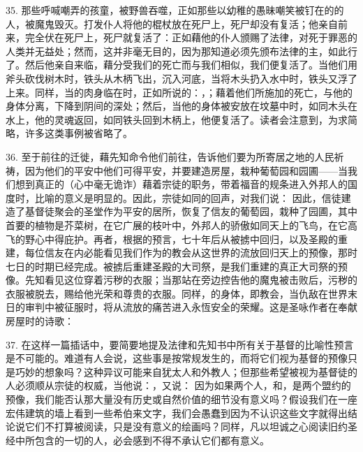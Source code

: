 35. 那些呼喊嘲弄的孩童，被野兽吞噬，正如那些以幼稚的愚昧嘲笑被钉在的的人，被魔鬼毁灭。打发仆人将他的棍杖放在死尸上，死尸却没有复活；他亲自前来，完全伏在死尸上，死尸就复活了：正如藉他的仆人颁赐了法律，对死于罪恶的人类并无益处；然而，这并非毫无目的，因为那知道必须先颁布法律的主，如此行了。然后他亲自来临，藉分受我们的死亡而与我们相似，我们便复活了。当他们用斧头砍伐树木时，铁头从木柄飞出，沉入河底，当将木头扔入水中时，铁头又浮了上来。同样，当的肉身临在时，正如所说的：，；藉着他们所施加的死亡，与他的身体分离，下降到阴间的深处；然后，当他的身体被安放在坟墓中时，如同木头在水上，他的灵魂返回，如同铁头回到木柄上，他便复活了。读者会注意到，为求简略，许多这类事例被省略了。\par

36. 至于前往的迁徙，藉先知命令他们前往，告诉他们要为所寄居之地的人民祈祷，因为他们的平安中他们可得平安，并要建造房屋，栽种葡萄园和园圃——当我们想到真正的（心中毫无诡诈）藉着宗徒的职务，带着福音的规条进入外邦人的国度时，比喻的意义是明显的。因此，宗徒如同的回声，对我们说： 因此，信徒建造了基督徒聚会的圣堂作为平安的居所，恢复了信友的葡萄园，栽种了园圃，其中首要的植物是芥菜树，在它广展的枝叶中，外邦人的骄傲如同天上的飞鸟，在它高飞的野心中得庇护。再者，根据的预言，七十年后从被掳中回归，以及圣殿的重建，每位信友在内必能看见我们作为的教会从这世界的流放回归天上的预像，那时七日的时期已经完成。被掳后重建圣殿的大司祭，是我们重建的真正大司祭的预像。先知看见这位穿着污秽的衣服；当那站在旁边控告他的魔鬼被击败后，污秽的衣服被脱去，赐给他光荣和尊贵的衣服。同样，的身体，即教会，当仇敌在世界末日的审判中被征服时，将从流放的痛苦进入永恆安全的荣耀。这是圣咏作者在奉献房屋时的诗歌：\par

37. 在这样一篇插话中，要简要地提及法律和先知书中所有关于基督的比喻性预言是不可能的。难道有人会说，这些事是按常规发生的，而将它们视为基督的预像只是巧妙的想象吗？这种异议可能来自犹太人和外教人；但那些希望被视为基督徒的人必须顺从宗徒的权威，当他说：，又说： 因为如果两个人，和，是两个盟约的预像，我们能否认那大量没有历史或自然价值的细节没有意义吗？假设我们在一座宏伟建筑的墙上看到一些希伯来文字，我们会愚蠢到因为不认识这些文字就得出结论说它们不打算被阅读，只是没有意义的绘画吗？同样，凡以坦诚之心阅读旧约圣经中所包含的一切的人，必会感到不得不承认它们都有意义。\par

